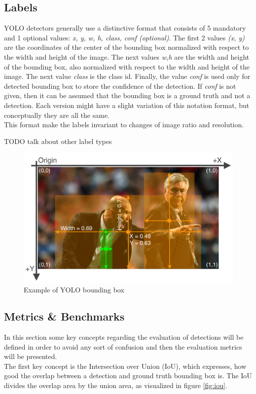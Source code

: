 \subsection{Labels}
YOLO detectors generally use a distinctive format that consists of 5 mandatory and 1 optional values: \textit{x, y, w, h, class, conf (optional)}. The first 2 values \textit{(x, y)} are the coordinates of the center of the bounding box normalized with respect to the width and height of the image. The next values \textit{w,h} are the width and height of the bounding box, also normalized with respect to the width and height of the image. The next value \textit{class} is the class id. Finally, the value \textit{conf} is used only for detected bounding box to store the confidence of the detection. If \textit{conf} is not given, then it can be assumed that the bounding box is a ground truth and not a detection. Each version might have a slight variation of this notation format, but conceptually they are all the same. \\
This format make the labels invariant to changes of image ratio and resolution.

TODO talk about other label types

\begin{figure}[!h]
  \includegraphics[width=\textwidth]{images/yolo_images/yolo_labels_zidane}
  \centering
  \caption{Example of YOLO bounding box \cite{yolov5_train_custom}}
\end{figure}

\subsection{Metrics \& Benchmarks}
In this section some key concepts regarding the evaluation of detections will be defined in order to avoid any sort of confusion and then the evaluation metrics will be presented. \\
The first key concept is the Intersection over Union (IoU), which expresses, how good the overlap between a detection and ground truth bounding box is. The IoU divides the overlap area by the union area, as visualized in figure \ref{fig:iou}.

